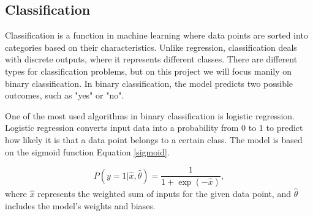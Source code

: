 \subsection{Classification}




Classification is a function in machine learning where data points are sorted into categories based on their characteristics. Unlike regression, classification deals with discrete outputs, where it represents different classes. There are different types for classification problems, but on this project we will focus manily on binary classification. In binary classification, the model predicts two possible outcomes, such as "yes" or "no". 

One of the most used algorithms in binary classification is logistic regression. Logistic regression converts input data into a probability from 0 to 1 to predict how likely it is that a data point belongs to a certain class. The model is based on the sigmoid function  Equation \ref{sigmoid}. %

\begin{equation}
    P(y = 1 | \hat{x}, \hat{\theta}) = \frac{1}{1 + \exp(-\hat{x})}, 
\end{equation}
where \( \hat{x} \) represents the weighted sum of inputs for the given data point, and \( \hat{\theta} \) includes the model's weights and biases.







